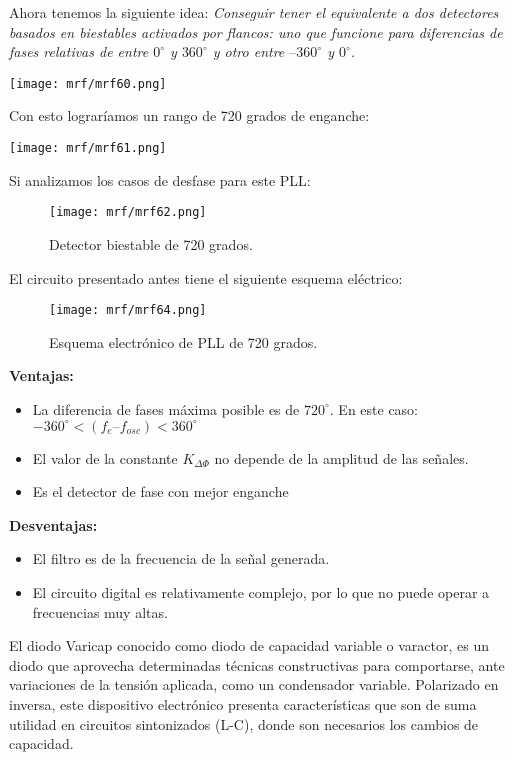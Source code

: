 \documentclass[
	12pt, %
	fleqn, %
	a4paper, %
	oneside, %
]{LegrandOrangeBook}
\begin{document}
Ahora tenemos la siguiente idea:
\textit{Conseguir tener el equivalente a dos detectores basados en biestables activados por flancos: uno que funcione para diferencias de fases relativas de entre $0^\circ$ y $360^\circ$ y otro entre $–360^\circ$ y $0^\circ$.}
\begin{center}
\texttt{[image: mrf/mrf60.png]}
\end{center}
Con esto lograríamos un rango de 720 grados de enganche:
\begin{center}
\texttt{[image: mrf/mrf61.png]}
\end{center}
Si analizamos los casos de desfase para este PLL:
\begin{figure}[H]
\centering
\texttt{[image: mrf/mrf62.png]}
\caption{Detector biestable de 720 grados.}
\end{figure}
El circuito presentado antes tiene el siguiente esquema eléctrico:
\begin{figure}[H]
\centering
\texttt{[image: mrf/mrf64.png]}
\caption{Esquema electrónico de PLL de 720 grados.}
\end{figure}
\textbf{Ventajas:}
\begin{itemize}
\item La diferencia de fases máxima posible es de $720^\circ$. En este caso: $-360^\circ < (f_e – f_{osc}) < 360^\circ$
\item El valor de la constante $K_{\Delta\Phi}$ no depende de la amplitud de las señales.
\item Es el detector de fase con mejor enganche
\end{itemize}
\textbf{Desventajas:}
\begin{itemize}
\item El filtro es de la frecuencia de la señal generada.
\item El circuito digital es relativamente complejo, por lo que no puede operar a frecuencias muy altas.
\end{itemize}
\begin{vocabulary}
El diodo Varicap conocido como diodo de capacidad variable o varactor, es un diodo que aprovecha determinadas técnicas constructivas para comportarse, ante variaciones de la tensión aplicada, como un condensador variable. Polarizado en inversa, este dispositivo electrónico presenta características que son de suma utilidad en circuitos sintonizados (L-C), donde son necesarios los cambios de capacidad.
\end{vocabulary}
\end{document}
